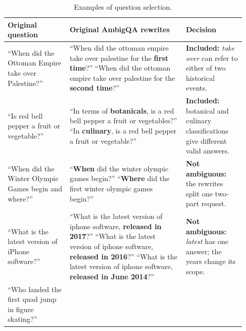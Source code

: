 \begin{table}[ht]
    \centering
    \caption{Examples of question selection.}
    \label{tab:ambigqa-hq-selection-examples}
    \vspace{4pt}
    \small
    \setlength{\tabcolsep}{4pt}
    \begin{tabular}{@{}p{0.24\linewidth}p{0.45\linewidth}p{0.23\linewidth}@{}}
        \toprule
        \textbf{Original question} & \textbf{Original AmbigQA rewrites} &
        \textbf{Decision} \\
        \midrule
        \raggedright ``When did the Ottoman Empire take over Palestine?'' &
        \raggedright ``When did the ottoman empire take over palestine for the
        \textbf{first time}?''
        \newline ``When did the ottoman empire take over palestine for the
        \textbf{second time}?'' &
        \raggedright \textbf{Included:} \emph{take over} can refer to either of
        two historical events. \tabularnewline
        \addlinespace
        \raggedright ``Is red bell pepper a fruit or vegetable?'' &
        \raggedright ``In terms of \textbf{botanicals}, is a red bell pepper a
        fruit or vegetables?''
        \newline ``In \textbf{culinary}, is a red bell pepper a fruit or
        vegetable?'' &
        \raggedright \textbf{Included:} botanical and culinary classifications
        give different valid answers. \tabularnewline
        \midrule
        \raggedright ``When did the Winter Olympic Games begin and where?'' &
        \raggedright ``\textbf{When} did the winter olympic games begin?''
        \newline ``\textbf{Where} did the first winter olympic games begin?'' &
        \raggedright \textbf{Not ambiguous:} the rewrites split one two-part
        request. \tabularnewline
        \addlinespace
        \raggedright ``What is the latest version of iPhone software?'' &
        \raggedright ``What is the latest version of iphone software,
        \textbf{released in 2017}?''
        \newline ``What is the latest version of iphone software,
        \textbf{released in 2016}?''
        \newline ``What is the latest version of iphone software,
        \textbf{released in June 2014}?'' &
        \raggedright \textbf{Not ambiguous:} \emph{latest} has one answer; the
        years change its scope. \tabularnewline
        \addlinespace
        \raggedright ``Who landed the first quad jump in figure skating?'' &

\end{tabular}
\end{table}
